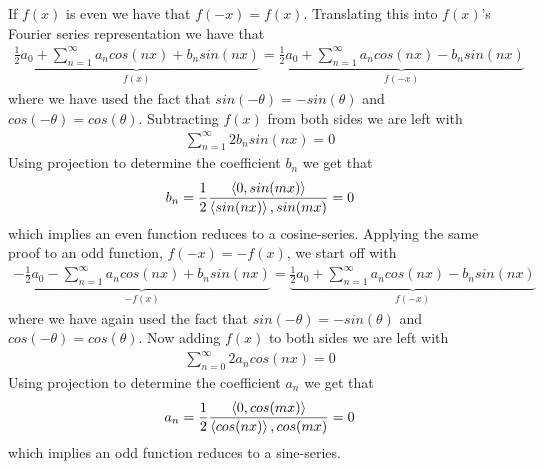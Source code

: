 \documentclass[12pt]{article}
\theoremstyle{remark}
\begin{document}
If $f(x)$ is even we have that $f(-x) = f(x)$. Translating this into $f(x)$'s Fourier series representation we have that 
\begin{align*}
	\underbrace{\frac{1}{2}a_0 + \sum\limits_{n=1}^\infty a_n cos(nx) + b_nsin(nx)}_{f(x)} = \underbrace{\frac{1}{2}a_0 + \sum\limits_{n=1}^\infty a_n cos(nx) - b_nsin(nx)}_{f(-x)}
\end{align*}
where we have used the fact that $sin(-\theta) = -sin(\theta)$ and $cos(-\theta) = cos(\theta)$. Subtracting $f(x)$ from both sides we are left with 
\begin{align*}
	\sum\limits_{n=1}^\infty 2b_nsin(nx) = 0
\end{align*} 
Using projection to determine the coefficient $b_n$ we get that 
\begin{align*}
b_n = \frac{1}{2}\frac{\braket{0, sin(mx)}}{\braket{sin(nx)}, sin(mx)} = 0	
\end{align*}
which implies an even function reduces to a cosine-series. Applying the same proof to an odd function, $f(-x) = -f(x)$, we start off with 
\begin{align*}
	\underbrace{-\frac{1}{2}a_0 - \sum\limits_{n=1}^\infty a_n cos(nx) + b_nsin(nx)}_{-f(x)} = \underbrace{\frac{1}{2}a_0 + \sum\limits_{n=1}^\infty a_n cos(nx) - b_nsin(nx)}_{f(-x)}
\end{align*}
where we have again used the fact that $sin(-\theta) = -sin(\theta)$ and $cos(-\theta) = cos(\theta)$. Now adding $f(x)$ to both sides we are left with
\begin{align*}
	\sum\limits_{n=0}^\infty 2a_ncos(nx) = 0 
\end{align*}
Using projection to determine the coefficient $a_n$ we get that 
\begin{align*}
a_n = \frac{1}{2}\frac{\braket{0, cos(mx)}}{\braket{cos(nx)}, cos(mx)} = 0	
\end{align*}
which implies an odd function reduces to a sine-series.
\end{document}
